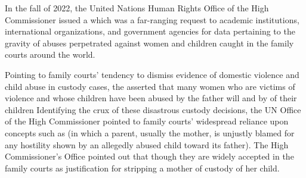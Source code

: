 





\noindent{}In the fall of 2022, the United Nations Human Rights Office of the
High Commissioner issued a  which was a far-ranging 
request to academic institutions, international organizations, 
and government agencies for data pertaining to the gravity of abuses perpetrated
against women and children caught in the family courts around the
world. \pfl{}


Pointing to family courts' tendency to dismiss evidence of domestic
violence and child abuse in custody cases, the  asserted
that many women who are victims of violence and whose children have
been abused by the father will  and by  of their children
 Identifying the crux of these
disastrous custody decisions, the UN Office of the High Commissioner
pointed to family courts' widespread reliance upon concepts such as
 (in which a parent, usually the mother, 
is unjustly blamed for any hostility shown by an allegedly abused child toward its
father). The High Commissioner's Office
pointed out that though  they are widely accepted in the family courts as 
justification for stripping a mother of custody of her child. \pfl{}

